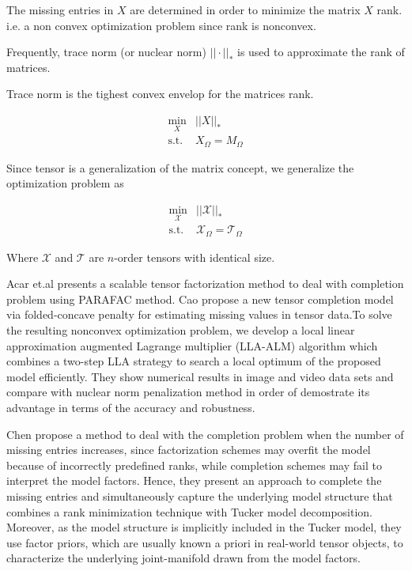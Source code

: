 \documentclass[letterpaper,12pt]{article}
\begin{document}
The missing entries in $X$ are determined in order to minimize the matrix $X$ rank. i.e. a non convex optimization problem since rank is nonconvex.

Frequently, trace norm (or nuclear norm) $||\cdot ||_*$ is used to approximate the rank of matrices.

Trace norm is the tighest convex envelop for the matrices rank.

\begin{equation} 
 \begin{split}
  \min_X & ||X||_*\\
  \text{s.t. } & X_\Omega = M_\Omega
 \end{split}
\end{equation}

Since tensor is a generalization of the matrix concept, we generalize the  optimization problem as

\begin{equation} 
 \begin{split}
  \min_{\mathcal{X}} & ||\mathcal{X}||_*\\
  \text{s.t. } & \mathcal{X}_\Omega = \mathcal{T}_\Omega
 \end{split}
\end{equation}

Where $\mathcal{X}$ and $\mathcal{T}$ are $n$-order tensors with identical size.

Acar et.al \cite{Acar2011} presents a scalable tensor factorization method to deal with completion problem using PARAFAC method. Cao \cite{Cao2015} propose a new tensor completion model via folded-concave penalty for estimating missing values in tensor data.To solve the resulting nonconvex optimization problem, we develop a local linear approximation augmented Lagrange multiplier (LLA-ALM) algorithm which combines a two-step LLA strategy to search a local optimum of the proposed model efficiently. They show numerical results in image and video data sets and compare with nuclear norm penalization method in order of demostrate its advantage in terms of the accuracy and robustness.


Chen \cite{Chen2014} propose a method to deal with the completion problem when the number of missing entries increases, since factorization schemes may overfit the model because of incorrectly predefined ranks, while completion schemes may fail to interpret the model factors.  
Hence, they present an approach to complete the missing entries and simultaneously capture the underlying model structure that combines a rank minimization technique with Tucker model decomposition. Moreover, as the model structure is implicitly included in the Tucker model, they  use factor priors, which are usually known a priori in real-world tensor objects, to characterize the underlying joint-manifold drawn from the model factors.
\end{document}
